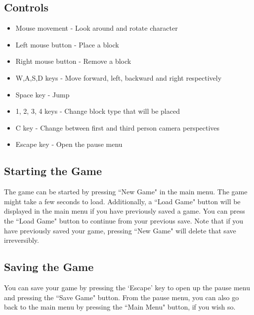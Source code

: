 \documentclass{report}
\begin{document}
\subsection{Controls}
\begin{itemize}
	\item Mouse movement - Look around and rotate character
	\item Left mouse button - Place a block
	\item Right mouse button - Remove a block
	\item W,A,S,D keys - Move forward, left, backward and right respectively
	\item Space key - Jump
	\item 1, 2, 3, 4 keys - Change block type that will be placed
	\item C key - Change between first and third person camera perspectives
	\item Escape key - Open the pause menu
\end{itemize}
\subsection{Starting the Game}
The game can be started by pressing ``New Game" in the main menu. The game might take a few seconds to load. Additionally, a ``Load Game" button will be displayed in the main menu if you have previously saved a game. You can press the ``Load Game" button to continue from your previous save. Note that if you have previously saved your game, pressing ``New Game" will delete that save irreversibly.
\subsection{Saving the Game}
You can save your game by pressing the `Escape' key to open up the pause menu and pressing the ``Save Game" button. From the pause menu, you can also go back to the main menu by pressing the ``Main Menu" button, if you wish so.
\end{document}
